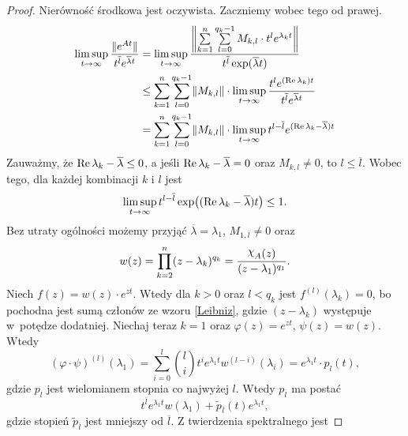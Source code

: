 \begin{proof}
  Nierówność środkowa jest oczywista. Zaczniemy wobec tego od prawej.
%
  \begin{align*}
    \limsup_{t\to\infty} \frac{ \norm{e^{At}} }{ t^{\overline{l}} e^{\overline{\lambda} t}} &=
    \limsup_{t\to\infty} \frac{\norm*{\sum\limits_{k=1}^n \sum\limits_{l=0}^{q_k - 1} M_{k,l} \cdot t^l e^{\lambda_k 
    t}}}{t^{\overline{l}} \exp(\overline{\lambda}t)} \\ &\leq
    \sum_{k=1}^n \sum_{l=0}^{q_k-1} \norm{M_{k,l}} \cdot \limsup_{t\to\infty} \frac{t^l e^{(\real \lambda_k) 
    t}}{t^{\overline{l}} e^{\overline{\lambda}t}} \\ &=
    \sum_{k=1}^n \sum_{l=0}^{q_k-1} \norm{M_{k,l}} \cdot \limsup_{t\to\infty} t^{l-\overline{l}} e^{(\real \lambda_k - 
    \overline{\lambda}) t}
  \end{align*}
%
  Zauważmy, że $\real \lambda_k - \overline{\lambda} \leq 0$, a jeśli $\real \lambda_k - \overline{\lambda} = 0$ oraz 
  $M_{k,l} \not= 0$, to $l \leq \overline{l}$. Wobec tego, dla każdej kombinacji $k$ i $l$ jest
%
  \begin{equation*}
    \limsup_{t\to\infty} t^{l-\overline{l}} \exp \p[\big]{(\real \lambda_k - \overline{\lambda}) t} \leq 1.
  \end{equation*}
%
  Bez utraty ogólności możemy przyjąć $\overline{\lambda} = \lambda_1$, $M_{1,\overline{l}} \not= 0$ oraz
%
  \begin{equation*}
    w(z) = \prod_{k=2}^{n} (z-\lambda_k)^{q_k} = \frac{\mychi_A(z)}{(z-\lambda_1)^{q_1}}.
  \end{equation*}
%
  Niech $f(z) = w(z) \cdot e^{zt}$. Wtedy dla $k>0$ oraz $l<q_k$ jest $f^{(l)}(\lambda_k) = 0$, bo pochodna jest sumą 
  członów ze wzoru \eqref{Leibniz}, gdzie $(z-\lambda_k)$ występuje w~potędze dodatniej. Niechaj teraz $k=1$ oraz 
  $\varphi(z) = e^{zt}$, $\psi(z) = w(z)$. Wtedy
%
  \begin{equation*}
    (\varphi \cdot \psi)^{(l)} (\lambda_1) = \sum_{i=0}^l \binom li t^i e^{\lambda_1 t} w^{(l-i)}(\lambda_i) =
    e^{\lambda_1 t} \cdot p_l(t),
  \end{equation*}
%
  gdzie $p_l$ jest wielomianem stopnia co najwyżej $l$. Wtedy $p_{\overline{l}}$ ma postać
%
  \begin{equation*}
    t^{\overline{l}} e^{\lambda_1 t} w(\lambda_1) + \widetilde{p}_{\overline{l}}(t) e^{\lambda_1 t},
  \end{equation*}
%
  gdzie stopień $\widetilde{p}_{\overline{l}}$ jest mniejszy od $\overline{l}$. Z twierdzenia spektralnego jest

\end{proof}
